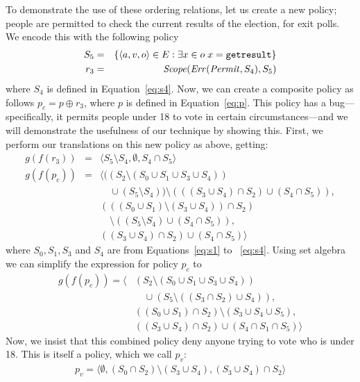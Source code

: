 To demonstrate the use of these ordering relations, 
let us create a new policy; people are permitted
to check the current results of the election, for exit polls.  
We encode this with the
following policy 
\begin{eqnarray*}
  S_5 & = & \{ \langle a, v, o \rangle \in E : 
  \exists x \in o \; x = \text{\texttt{getresult}} \} \\
  r_3 & = & \text{\textit{Scope}} (\text{\textit{Err}} (\text{\textit{Permit}}, S_4), S_5)
\end{eqnarray*}
where $S_4$ is defined in Equation~\eqref{eq:s4}.
Now, we can create a composite policy as follows $p_c = p \oplus r_3$,
where $p$ is defined in Equation~\eqref{eq:p}.  This
policy has a bug---specifically, it permits people under 18 to vote in
certain circumstances---and we will demonstrate the usefulness of our
technique by showing this.  First, we perform our translations on this
new policy as above, getting:
\begin{eqnarray*}
  g(f(r_3)) & = & \langle S_5 \setminus S_4, \emptyset, S_4 \cap S_5 \rangle \\
  g(f(p_c)) 
    & = &  \langle ((S_2 \setminus (S_0 \cup S_1 \cup S_3 \cup S_4)) \\
    & & \quad \cup (S_5 \setminus S_4)) \setminus
    (((S_3 \cup S_4) \cap S_2) 
    \cup (S_4 \cap S_5)), \\
    & & (((S_0 \cup S_1) \setminus (S_3 \cup S_4)) \cap S_2) \\
    & & \quad \setminus ((S_5 \setminus S_4)
    \cup (S_4 \cap S_5)), \\
    & & ((S_3 \cup S_4) \cap S_2) \cup (S_4 \cap S_5) \rangle
\end{eqnarray*}
where $S_0,S_1, S_3$ and $S_4$ are from
Equations~\eqref{eq:s1} to ~\eqref{eq:s4}.
Using set algebra we can simplify the expression for policy $p_c$ to
\begin{align*}
  g(f(p_c)) = \langle & \left( S_2 \setminus (S_0 \cup S_1 \cup S_3 \cup S_4) \right)
    \\ & \quad
    \cup \left( S_5 \setminus ((S_3 \cap S_2) \cup S_4)
    \right), \\
    & ((S_0 \cup S_1) \cap S_2) \setminus (S_3 \cup S_4 \cup
    S_5), \\
    & ((S_3 \cup S_4) \cap S_2) \cup (S_4 \cap S_1 \cap S_5) \rangle
\end{align*}
Now, we insist that this combined policy deny anyone trying to vote
who is under 18.  This is itself a policy, which we call $p_v$:
\begin{align*}
  p_v = \langle \emptyset, (S_0 \cap S_2) \setminus (S_3 \cup S_4),
  (S_3 \cup S_4) \cap S_2 \rangle
\end{align*}
